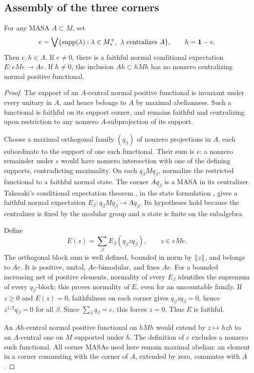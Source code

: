 \subsection{Assembly of the three corners}

\begin{lemma}\label{gen:support-decomposition}
For any MASA $A\subset M$, set
\[
 e=\bigvee\{\operatorname{supp}(\lambda):\lambda\in M_*^+,
                  \ \lambda\text{ centralizes }A\},\qquad h=\mathbf 1-e.
\]
Then $e,h\in A$. If $e\ne0$, there is a faithful normal conditional
expectation $E:eMe\to Ae$. If $h\ne0$, the inclusion
$Ah\subset hMh$ has no nonzero centralizing normal positive functional.
\end{lemma}

\begin{proof}
The support of an $A$-central normal positive functional is invariant
under every unitary in $A$, and hence belongs to $A$ by maximal
abelianness. Such a functional is faithful on its support corner,
and remains faithful and centralizing upon restriction to any nonzero
$A$-subprojection of its support.

Choose a maximal orthogonal family $(q_\beta)$ of nonzero projections
in $A$, each subordinate to the support of one such functional.
Their sum is $e$: a nonzero remainder under $e$ would have nonzero
intersection with one of the defining supports, contradicting
maximality. On each $q_\beta Mq_\beta$, normalize the restricted
functional to a faithful normal state. The corner $Aq_\beta$ is a
MASA in its centralizer. Takesaki's conditional expectation theorem
\cite{Takesaki72}, in the state formulation
\cite[Theorem~6.6]{Hiai20}, gives a faithful normal expectation
$E_\beta:q_\beta Mq_\beta\to Aq_\beta$. Its hypotheses hold because
the centralizer is fixed by the modular group and a state is finite
on the subalgebra.

Define
\begin{equation}\label{gen:glued-expectation}
 E(z)=\sum_\beta E_\beta(q_\beta zq_\beta),\qquad z\in eMe.
\end{equation}
The orthogonal block sum is well defined, bounded in norm by
$\left\lVert z\right\rVert$, and belongs to $Ae$. It is positive, unital, $Ae$-bimodular,
and fixes $Ae$. For a bounded increasing net of positive elements,
normality of every $E_\beta$ identifies the supremum of every
$q_\beta$-block; this proves normality of $E$, even for an uncountable
family. If $z\geq0$ and $E(z)=0$, faithfulness on each corner gives
$q_\beta zq_\beta=0$, hence $z^{1/2}q_\beta=0$ for all $\beta$.
Since $\sum_\beta q_\beta=e$, this forces $z=0$. Thus $E$ is faithful.

An $Ah$-central normal positive functional on $hMh$ would extend by
$z\mapsto hzh$ to an $A$-central one on $M$ supported under $h$.
The definition of $e$ excludes a nonzero such functional. All corner
MASAs used here remain maximal abelian: an element in a corner
commuting with the corner of $A$, extended by zero, commutes with $A$.
\end{proof}

